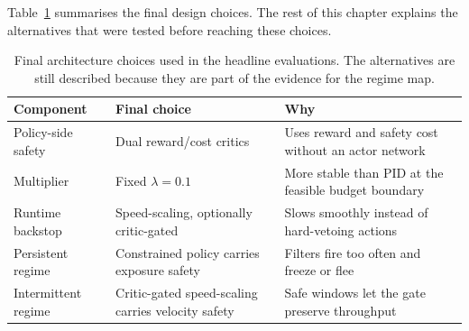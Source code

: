 \documentclass[11pt,a4paper]{report}
\begin{document}
Table~\ref{tab:method-final-choices} summarises the final design
choices. The rest of this chapter explains the alternatives that were
tested before reaching these choices.

\begin{table}[htbp]
\centering
\small
\caption{Final architecture choices used in the headline evaluations.
The alternatives are still described because they are part of the
evidence for the regime map.}
\label{tab:method-final-choices}
\renewcommand{\arraystretch}{1.15}
\begin{tabular}{@{}
    >{\raggedright\arraybackslash}p{}
    >{\raggedright\arraybackslash}p{}
    >{\raggedright\arraybackslash}p{}@{}}
\toprule
Component & Final choice & Why \\
\midrule
Policy-side safety & Dual reward/cost critics & Uses reward and safety cost without an actor network \\
Multiplier & Fixed $\lambda = 0.1$ & More stable than PID at the feasible budget boundary \\
Runtime backstop & Speed-scaling, optionally critic-gated & Slows smoothly instead of hard-vetoing actions \\
Persistent regime & Constrained policy carries exposure safety & Filters fire too often and freeze or flee \\
Intermittent regime & Critic-gated speed-scaling carries velocity safety & Safe windows let the gate preserve throughput \\
\bottomrule
\end{tabular}
\end{table}
\end{document}
